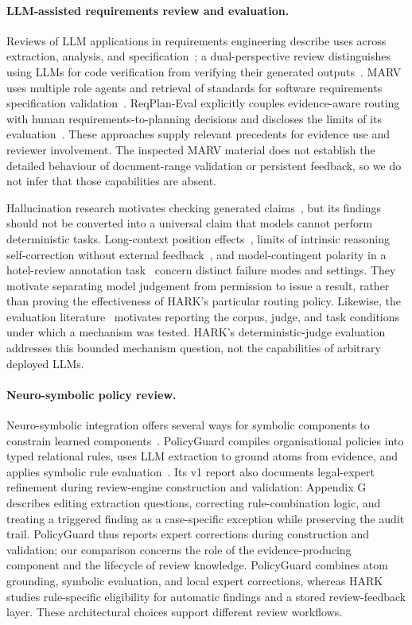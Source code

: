 \documentclass[computers,article,submit,moreauthors]{Definitions/mdpi}
\begin{document}
\paragraph{LLM-assisted requirements review and evaluation.}
Reviews of LLM applications in requirements engineering describe uses across extraction, analysis, and specification~\cite{hemmat2025}; a dual-perspective review distinguishes using LLMs for code verification from verifying their generated outputs~\cite{dolcetti2025}. MARV uses multiple role agents and retrieval of standards for software requirements specification validation~\cite{chinnam2025}. ReqPlan-Eval explicitly couples evidence-aware routing with human requirements-to-planning decisions and discloses the limits of its evaluation~\cite{alsawalqah2026}. These approaches supply relevant precedents for evidence use and reviewer involvement. The inspected MARV material does not establish the detailed behaviour of document-range validation or persistent feedback, so we do not infer that those capabilities are absent.

Hallucination research motivates checking generated claims~\cite{huang2025hall}, but its findings should not be converted into a universal claim that models cannot perform deterministic tasks. Long-context position effects~\cite{liu2024lost}, limits of intrinsic reasoning self-correction without external feedback~\cite{huang2024self}, and model-contingent polarity in a hotel-review annotation task~\cite{polarity2026} concern distinct failure modes and settings. They motivate separating model judgement from permission to issue a result, rather than proving the effectiveness of HARK's particular routing policy. Likewise, the evaluation literature~\cite{chang2024eval} motivates reporting the corpus, judge, and task conditions under which a mechanism was tested. HARK's deterministic-judge evaluation addresses this bounded mechanism question, not the capabilities of arbitrary deployed LLMs.

\paragraph{Neuro-symbolic policy review.}
Neuro-symbolic integration offers several ways for symbolic components to constrain learned components~\cite{garcez2023}. PolicyGuard compiles organisational policies into typed relational rules, uses LLM extraction to ground atoms from evidence, and applies symbolic rule evaluation~\cite{malik2026}. Its v1 report also documents legal-expert refinement during review-engine construction and validation: Appendix G describes editing extraction questions, correcting rule-combination logic, and treating a triggered finding as a case-specific exception while preserving the audit trail. PolicyGuard thus reports expert corrections during construction and validation; our comparison concerns the role of the evidence-producing component and the lifecycle of review knowledge. PolicyGuard combines atom grounding, symbolic evaluation, and local expert corrections, whereas HARK studies rule-specific eligibility for automatic findings and a stored review-feedback layer. These architectural choices support different review workflows.
\end{document}
